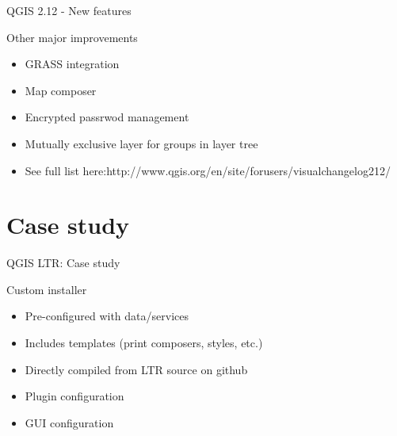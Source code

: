 \begin{frame}{QGIS 2.12 - New features}
	\begin{block}{Other major improvements}
		\begin{itemize}
			\item GRASS integration
			\item Map composer
			\item Encrypted passrwod management
			\item Mutually exclusive layer for groups in layer tree
			\item See full list here:http://www.qgis.org/en/site/forusers/visualchangelog212/
		\end{itemize}
	\end{block}
\end{frame}

\section{Case study}
\begin{frame}{QGIS LTR: Case study}
	\begin{block}{Custom installer}
		\begin{itemize}
			\item Pre-configured with data/services
			\item Includes templates (print composers, styles, etc.)
			\item Directly compiled from LTR source on github
			\item Plugin configuration
			\item GUI configuration
		\end{itemize}
	\end{block}
\end{frame}